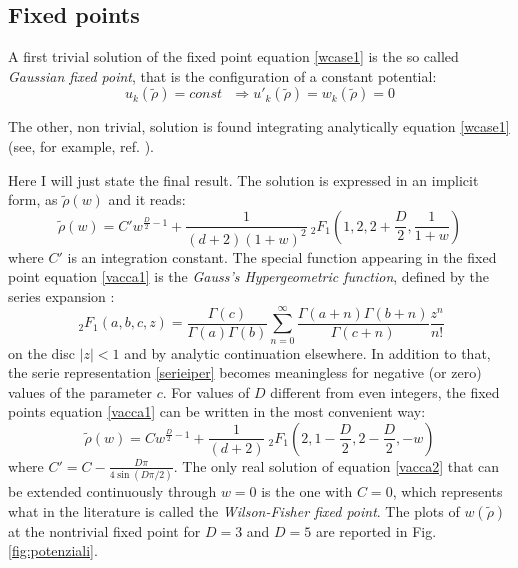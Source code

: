 \subsection{Fixed points}

A first trivial solution of the fixed point equation \eqref{wcase1} is the so called \emph{Gaussian fixed point}, that is the configuration of a constant potential:
\begin{equation}
 u_k(\widetilde{\rho}) = const\ \ \ \Longrightarrow u'_k(\widetilde{\rho}) = w_k(\widetilde{\rho}) = 0 
\end{equation}

The other, non trivial, solution is found integrating analytically equation \eqref{wcase1} (see, for example, ref. \cite{Marchais}\cite{vaccascaling}).

Here  I will just state the final result.
The solution is expressed in an implicit form, as $ \widetilde{\rho}(w)$ and it reads:
\begin{equation}\label{vacca1}
 \widetilde{\rho}(w) = C' w^{\frac{D}{2} - 1} + \frac{1}{(d + 2)(1 + w)^2} \ _2F_1\left(1, 2, 2 + \frac{D}{2}, \frac{1}{1 + w}\right)
\end{equation}
where $C'$ is an integration constant.
The special function appearing in the fixed point equation \eqref{vacca1} is the \emph{Gauss's Hypergeometric function}, defined by the series expansion \cite{M117}\cite{M118}:
\begin{equation}\label{serieiper}
 \ _2F_1\left(a, b, c, z\right) = \frac{\Gamma(c)}{\Gamma(a)\Gamma(b)}\sum_{n = 0}^{\infty} \frac{\Gamma(a + n)\Gamma(b + n)}{\Gamma(c + n)}\frac{z^n}{n!}
\end{equation}
on the disc $|z| < 1$ and by analytic continuation elsewhere. In addition to that, the serie representation \eqref{serieiper} becomes meaningless  for negative (or zero) 
values of the parameter $c$.
For values of $D$ different from even integers, the fixed points equation \eqref{vacca1} can be written in the most convenient way:
\begin{equation}\label{vacca2}
  \widetilde{\rho}(w) = C w^{\frac{D}{2} - 1} + \frac{1}{(d + 2)} \ _2F_1\left(2, 1 - \frac{D}{2}, 2 - \frac{D}{2}, -w \right)
\end{equation}
where $C' = C - \frac{D\pi}{4 \sin(D\pi/2)}$. The only real solution of equation \eqref{vacca2} that can be extended continuously through $w = 0$
is the one with $C = 0$, which represents what in the literature is called the \emph{Wilson-Fisher fixed point}.
The plots of $w(\widetilde{\rho})$ at the nontrivial fixed point for $D= 3$ and $D=5$ are reported in Fig.\ref{fig:potenziali}.

